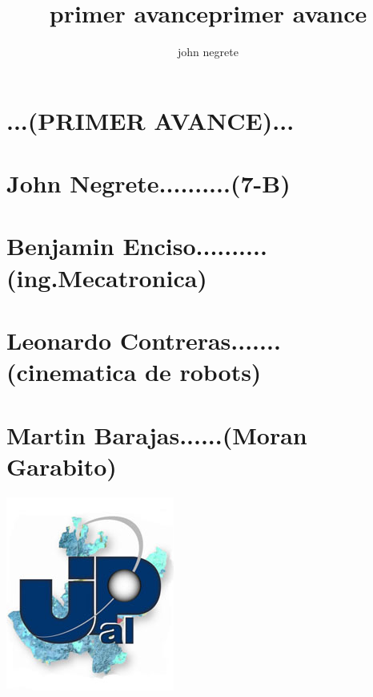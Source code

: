 \documentclass[12pt,letterpaper]{article}
\author{john negrete}
\title {primer avance}
\begin{document}
 

\title {primer avance}

\section*{                  ...(PRIMER AVANCE)... }
\section*{John Negrete..........(7-B)}
\section*{Benjamin Enciso..........(ing.Mecatronica)}
\section*{Leonardo Contreras.......(cinematica de robots)}
\section*{Martin Barajas......(Moran Garabito)}
\includegraphics[scale=2]{up1.jpg} 
\end{document}
